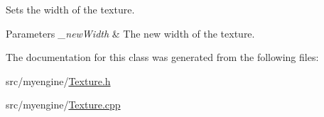 Sets the width of the texture. 


\begin{DoxyParams}{Parameters}
{\em \+\_\+new\+Width} & The new width of the texture. \\
\hline
\end{DoxyParams}


The documentation for this class was generated from the following files\+:\begin{DoxyCompactItemize}
\item 
src/myengine/\hyperlink{_texture_8h}{Texture.\+h}\item 
src/myengine/\hyperlink{_texture_8cpp}{Texture.\+cpp}\end{DoxyCompactItemize}
